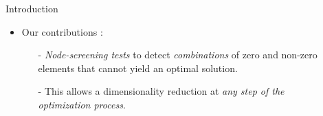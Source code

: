 \documentclass[final]{beamer}
\newlength{\sepwid}
\newlength{\onecolwid}
\newlength{\twocolwid}
\newcommand{\emphone}[1]{\textit{\color{norange}#1}}
\begin{document}
\begin{frame}[t]
\begin{columns}[t]
\begin{column}{\onecolwid}
\begin{block}{Introduction}
        \begin{itemize}
            \item \hspace*{0.1em} Our contributions :
            \begin{itemize}
                \normalsize \item[-] \hspace*{0.1em} \emphone{Node-screening tests} to detect \emphone{combinations} of zero and non-zero elements that cannot yield an optimal solution.
                \item[-] \hspace*{0.1em} This allows a dimensionality reduction at \emphone{any step of the optimization process}.
            \end{itemize}
        \end{itemize}
    \end{block}
\end{column}

\begin{column}{\sepwid}\end{column}

\begin{column}{\twocolwid}    
    \begin{columns}[t,totalwidth=\twocolwid]
        \begin{column}{\onecolwid}\vspace{-.6in} 
            

\end{column}
\end{columns}
\end{column}
\end{columns}
\end{frame}
\end{document}
